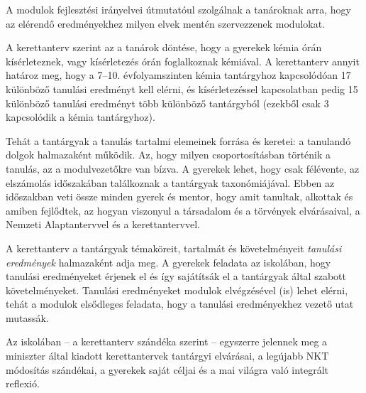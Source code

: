 A modulok fejlesztési irányelvei útmutatóul szolgálnak a tanároknak arra, hogy az elérendő eredményekhez milyen elvek mentén szervezzenek modulokat.


A kerettanterv szerint az a tanárok döntése, hogy a gyerekek kémia órán kísérleteznek, vagy kísérletezés órán foglalkoznak kémiával. A kerettanterv annyit határoz meg, hogy  a 7--10. évfolyamszinten kémia tantárgyhoz kapcsolódóan 17 különböző tanulási eredményt kell elérni, és kísérletezéssel kapcsolatban pedig 15 különböző tanulási eredményt több különböző tantárgyból (ezekből csak 3 kapcsolódik a kémia tantárgyhoz).

Tehát a tantárgyak a tanulás tartalmi elemeinek forrása és keretei: a tanulandó dolgok halmazaként működik. Az, hogy milyen csoportosításban történik a tanulás, az a modulvezetőkre van bízva. A gyerekek lehet, hogy csak félévente, az elszámolás időszakában találkoznak a tantárgyak taxonómiájával. Ebben az időszakban veti össze minden gyerek és mentor, hogy amit tanultak, alkottak és amiben fejlődtek, az hogyan viszonyul a társadalom és a törvények elvárásaival, a Nemzeti Alaptantervvel és a kerettantervvel.

A kerettanterv a tantárgyak témaköreit, tartalmát és követelményeit \emph{tanulási eredmények} halmazaként adja meg. A gyerekek feladata az iskolában, hogy tanulási eredményeket érjenek el és így sajátítsák el a tantárgyak által szabott követelményeket. Tanulási eredményeket modulok elvégzésével (is) lehet elérni, tehát a modulok elsődleges feladata, hogy a tanulási eredményekhez vezető utat mutassák.

Az iskolában -- a kerettanterv szándéka szerint -- egyszerre jelennek meg a miniszter által kiadott kerettantervek tantárgyi elvárásai, a legújabb NKT módosítás szándékai, a gyerekek saját céljai és a mai világra való integrált reflexió. 